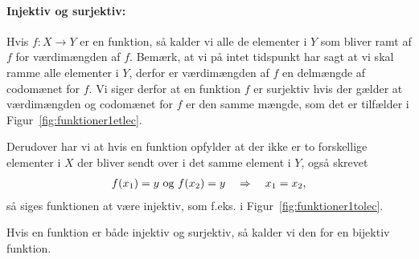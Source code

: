 \paragraph*{Injektiv og surjektiv:}
Hvis $f \colon X \to Y$ er en funktion, så kalder vi alle de elementer i $Y$ som bliver ramt af $f$ for værdimængden af $f$. Bemærk, at vi på intet tidspunkt har sagt at vi skal ramme alle elementer i $Y$, derfor er værdimængden af $f$ en delmængde af codomænet for $f$. Vi siger derfor at en funktion $f$ er surjektiv hvis der gælder at værdimængden og codomænet for $f$ er den samme mængde, som det er tilfælder i Figur~\ref{fig:funktioner1etlec}.

Derudover har vi at hvis en funktion opfylder at der ikke er to forskellige elementer i $X$ der bliver sendt over i det samme element i $Y$, også skrevet
\begin{align*}
f(x_1) = y \textup{ og } f(x_2) =y \quad  \Rightarrow \quad x_1=x_2, 
\end{align*}
så siges funktionen at være injektiv, som f.eks. i Figur~\ref{fig:funktioner1tolec}. 

Hvis en funktion er både injektiv og surjektiv, så kalder vi den for en bijektiv funktion.

